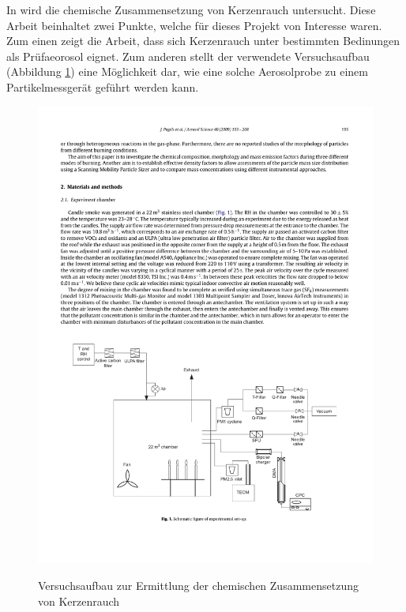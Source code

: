 In \cite{candle} wird die chemische Zusammensetzung von Kerzenrauch untersucht. Diese Arbeit beinhaltet zwei Punkte, welche f\"{u}r dieses Projekt von Interesse waren. Zum einen zeigt die Arbeit, dass sich Kerzenrauch unter bestimmten Bedinungen als Pr\"{u}faeorosol eignet. Zum anderen stellt der verwendete Versuchsaufbau (Abbildung \ref{fig:kerze_exp}) eine M\"{o}glichkeit dar, wie eine solche Aerosolprobe zu einem Partikelmessger\"{a}t gef\"{u}hrt werden kann. 

\begin{figure}[H]
	\myfloatalign
	{\includegraphics[width=.9\linewidth]{gfx/related/kerze_versuch.pdf}} \quad
	\caption[Versuchsaufbau zur Ermittlung der chemischen Zusammensetzung von Kerzenrauch\cite{candle}]
	{Versuchsaufbau zur Ermittlung der chemischen Zusammensetzung von Kerzenrauch\cite{candle}}
	\label{fig:kerze_exp}
\end{figure} 

